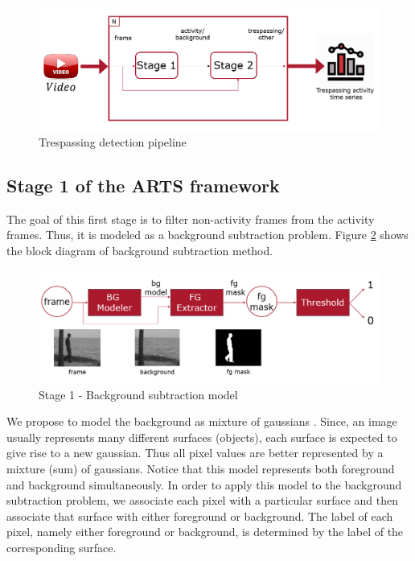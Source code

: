 \begin{figure}
    \centering
    \includegraphics[width=\linewidth]{images/trespassing-detection-pipeline.PNG}
    \caption{Trespassing detection pipeline}
    \label{fig:trespassing-detection-pipeline}
\end{figure}


\subsection{Stage 1 of the ARTS framework}
\label{sec:stage1}
The goal of this first stage is to filter non-activity frames from the activity frames. Thus, it is modeled as a background subtraction problem. Figure \ref{fig:background-subtraction-model} shows the block diagram of background subtraction method. 
\begin{figure}
    \centering
    \includegraphics[width=\linewidth]{images/background-subtraction-model.PNG}
    \caption{Stage 1 - Background subtraction model}
    \label{fig:background-subtraction-model}
\end{figure}

We propose to model the background as mixture of gaussians \cite{stauffer1999adaptive,power2002understanding}. Since, an image usually represents many different surfaces (objects), each surface is expected to give rise to a new gaussian. Thus all pixel values are better represented by a mixture (sum) of gaussians. Notice that this model represents both foreground and background simultaneously. In order to apply this model to the background subtraction problem, we associate each pixel with a particular surface and then associate that surface with either foreground or background. The label of each pixel, namely either foreground or background, is determined by the label of the corresponding surface. 


